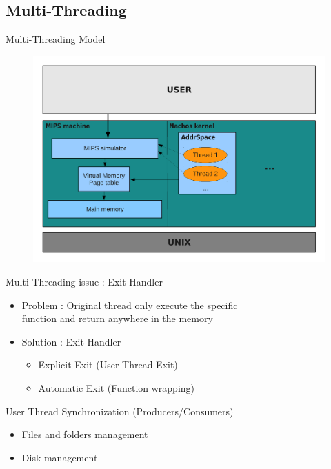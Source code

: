 \documentclass{beamer}
\begin{document}
\subsection{Multi-Threading}
\begin{frame}{Multi-Threading Model}
    \begin{figure}[ht]
        \includegraphics[width=0.8\linewidth]{threadschema.pdf}
    \end{figure}
\end{frame}

\begin{frame}{Multi-Threading issue : Exit Handler}
    \begin{itemize}
        \item Problem : Original thread only execute the specific 
            \\function and return anywhere in the memory 
        \item Solution : Exit Handler
            \begin{itemize}
                \item Explicit Exit (User Thread Exit)
                \item Automatic Exit (Function wrapping)
            \end{itemize}
    \end{itemize}
\end{frame}

\begin{frame}{User Thread Synchronization (Producers/Consumers)}
    \begin{itemize}
        \item Files and folders management
        \item Disk management
    \end{itemize}
\end{frame}
\end{document}
